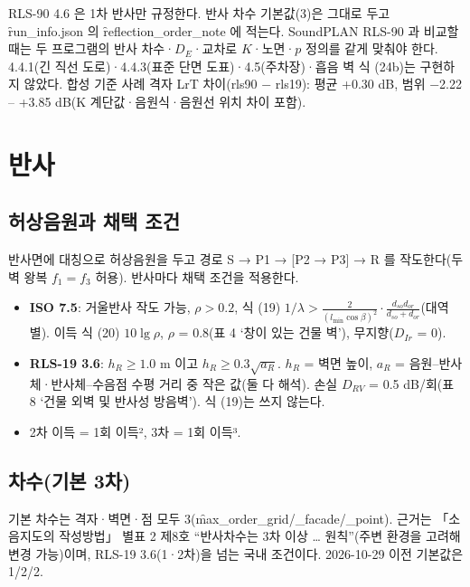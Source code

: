 \documentclass[10.5pt,a4paper]{article}
\begin{document}
 RLS-90 4.6 은 1차 반사만 규정한다. 반사 차수 기본값(3)은 그대로 두고 \f{run\_info.json} 의 \f{reflection\_order\_note} 에 적는다. SoundPLAN RLS-90 과 비교할 때는 두 프로그램의 반사 차수·$D_E$·교차로 $K$·노면·$p$ 정의를 같게 맞춰야 한다. 4.4.1(긴 직선 도로)·4.4.3(표준 단면 도표)·4.5(주차장)·흡음 벽 식 (24b)는 구현하지 않았다. 합성 기준 사례 격자 LrT 차이(rls90 − rls19): 평균 +0.30 dB, 범위 −2.22 – +3.85 dB(K 계단값·음원식·음원선 위치 차이 포함).

\section{반사}

\subsection{허상음원과 채택 조건}
반사면에 대칭으로 허상음원을 두고 경로 S → P1 → [P2 → P3] → R 를 작도한다(두 벽 왕복 $f_1 = f_3$ 허용). 반사마다 채택 조건을 적용한다.
\begin{itemize}
\item \textbf{ISO 7.5}: 거울반사 작도 가능, $\rho > 0.2$, 식 (19) $1/\lambda > \frac{2}{(l_\mathrm{min}\cos\beta)^2}\cdot\frac{d_{so}d_{or}}{d_{so}+d_{or}}$(대역별). 이득 식 (20) $10\lg\rho$, $\rho$ = 0.8(표 4 ‘창이 있는 건물 벽’), 무지향($D_{Ir}$ = 0).
\item \textbf{RLS-19 3.6}: $h_R \ge 1.0$ m 이고 $h_R \ge 0.3\sqrt{a_R}$. $h_R$ = 벽면 높이, $a_R$ = 음원–반사체·반사체–수음점 수평 거리 중 작은 값(둘 다 해석). 손실 $D_{RV}$ = 0.5 dB/회(표 8 ‘건물 외벽 및 반사성 방음벽’). 식 (19)는 쓰지 않는다.
\item 2차 이득 = 1회 이득², 3차 = 1회 이득³.
\end{itemize}

\subsection{차수(기본 3차)}
기본 차수는 격자·벽면·점 모두 3(\f{max\_order\_grid/\_facade/\_point}). 근거는 「소음지도의 작성방법」 별표 2 제8호 ``반사차수는 3차 이상 … 원칙''(주변 환경을 고려해 변경 가능)이며, RLS-19 3.6(1·2차)을 넘는 국내 조건이다. 2026-10-29 이전 기본값은 1/2/2.
\end{document}
